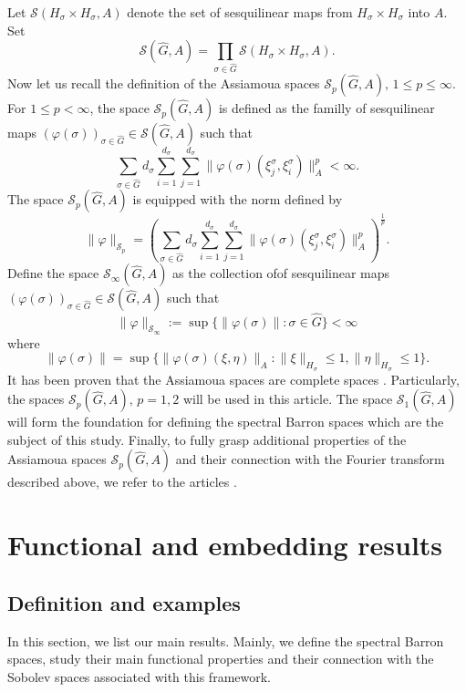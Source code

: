 \documentclass[12pt]{amsart}%
\begin{document}
Let $\mathscr{S}(H_\sigma \times H_\sigma,A)$ denote the set of sesquilinear maps from $H_\sigma \times H_\sigma$ into $A$. Set  
$$\mathscr{S}(\widehat{G},A)=\prod\limits_{\sigma \in \widehat{G}}\mathscr{S}(H_\sigma \times H_\sigma,A).$$
Now let us recall the definition of  the Assiamoua spaces $\mathscr{S}_p(\widehat{G},A),\, 1\leq p\leq \infty$. For $1\leq p< \infty$,  the space $\mathscr{S}_p(\widehat{G},A)$ is defined  as  the familly of sesquilinear maps $\left(\varphi (\sigma)\right)_{\sigma \in \widehat{G}}\in \mathscr{S}(\widehat{G},A)$ such that 
\begin{equation}
\sum\limits_{\sigma \in \widehat{G}}d_\sigma \sum\limits_{i=1}^{d_\sigma}\sum\limits_{j=1}^{d_\sigma}\|\varphi (\sigma)(\xi_j^\sigma,\xi_i^\sigma)\|_A^p<\infty.
\end{equation}
The space $\mathscr{S}_p(\widehat{G},A)$ is equipped with the norm  defined by
\begin{equation}
\|\varphi\|_{\mathscr{S}_p}=\left(  \sum\limits_{\sigma \in \widehat{G}}d_\sigma \sum\limits_{i=1}^{d_\sigma}\sum\limits_{j=1}^{d_\sigma}\|\varphi (\sigma)(\xi_j^\sigma,\xi_i^\sigma)\|_A^p\right)^{\frac{1}{p}}.
\end{equation}
Define the space  $\mathscr{S}_\infty(\widehat{G},A)$ as the collection ofof sesquilinear maps $\left(\varphi (\sigma)\right)_{\sigma \in \widehat{G}}\in \mathscr{S}(\widehat{G},A)$ such that 
$$
\|\varphi\|_{\mathscr{S}_\infty}:=\sup\{\|\varphi(\sigma)\| : \sigma \in \widehat{G}\}<\infty
$$
where
$$\|\varphi(\sigma)\|=\sup\{\|\varphi(\sigma)(\xi,\eta)\|_A : \|\xi\|_{H_\sigma}\leq 1, \|\eta\|_{H_\sigma}\leq 1\}.$$
 It has been proven that the Assiamoua spaces   are complete spaces \cite{Mensah1}. Particularly, the spaces $\mathscr{S}_p(\widehat{G},A),\, p=1,2$  will be used in this article. The space $\mathscr{S}_1(\widehat{G},A)$ will form the foundation for defining the  spectral Barron spaces which are the subject of this study. 
Finally, to fully grasp  additional properties of the Assiamoua spaces $\mathscr{S}_p(\widehat{G},A)$  and their connection with the Fourier transform described above,  we refer to the  articles \cite{AssiamouaOlubummo1989, Mensah1, Mensah3}.
\section{Functional and embedding results}\label{Functional and embedding results}
\subsection{Definition and examples}
In this section, we list our main results. Mainly, we define the spectral Barron  spaces, study their main functional properties and their connection with the Sobolev spaces associated with this framework.
\end{document}
